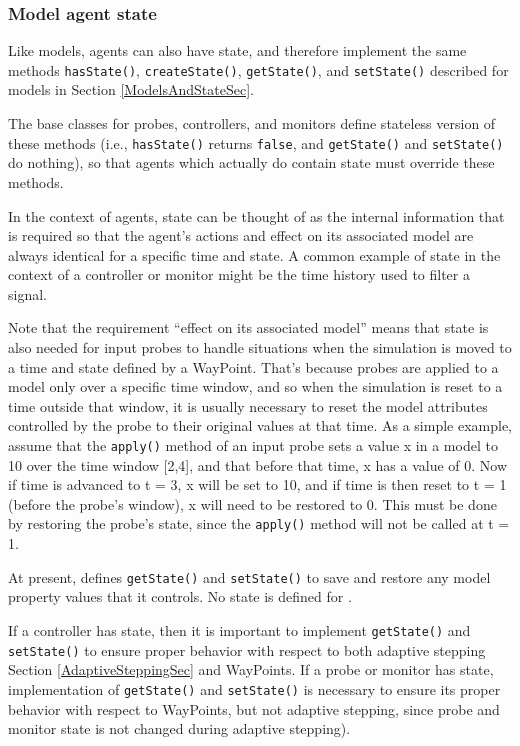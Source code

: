 \documentclass{article}
\begin{document}
\subsubsection{Model agent state}
\label{ModelAgentState}

Like models, agents can also have state, and therefore implement the
same methods {\tt hasState()}, {\tt createState()}, {\tt getState()},
and {\tt setState()} described for models in Section
\ref{ModelsAndStateSec}.

The base classes for probes, controllers, and monitors define
stateless version of these methods (i.e., {\tt hasState()} returns
{\tt false}, and {\tt getState()} and {\tt setState()} do nothing), so
that agents which actually do contain state must override these
methods.

In the context of agents, state can be thought of as the internal
information that is required so that the agent's actions and effect on
its associated model are always identical for a specific time and
state.  A common example of state in the context of a controller or
monitor might be the time history used to filter a signal.

Note that the requirement ``effect on its associated model'' means
that state is also needed for input probes to handle situations when
the simulation is moved to a time and state defined by a
WayPoint. That's because probes are applied to a model only over a
specific time window, and so when the simulation is reset to a time
outside that window, it is usually necessary to reset the model
attributes controlled by the probe to their original values at that
time. As a simple example, assume that the {\tt apply()} method of an
input probe sets a value x in a model to 10 over the time window
[2,4], and that before that time, x has a value of 0. Now
if time is advanced to t = 3, x will be set to 10, and if time is then
reset to t = 1 (before the probe's window), x will need to be restored
to 0. This must be done by restoring the probe's
state, since the {\tt apply()} method will not be called at t = 1.

At present, 
defines {\tt getState()} and {\tt setState()} to save and restore any
model property values that it controls. No state is defined for
.

\begin{sideblock}
If a controller has state, then it is important to implement
{\tt getState()} and {\tt setState()} to ensure proper behavior with
respect to both
adaptive stepping Section \ref{AdaptiveSteppingSec} and WayPoints.
If a probe or monitor has state, implementation
of {\tt getState()} and {\tt setState()} is necessary
to ensure its proper behavior with respect to WayPoints,
but not adaptive stepping, since probe and
monitor state is not changed during adaptive stepping).
\end{sideblock}
\end{document}
